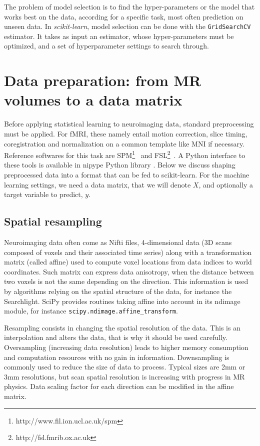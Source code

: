 \documentclass{frontiersSCNS} %
\begin{document}
The problem of model selection is to find the hyper-parameters or the
model that works best on the data, according for a specific task, most
often prediction on unseen data.
%
In {\em scikit-learn}, model selection can be done with the
\texttt{GridSearchCV} estimator. It takes as input an estimator, whose
hyper-parameters must be optimized, and a set of hyperparameter settings
to search through. 

\section{Data preparation: from MR volumes to a data matrix}

Before applying statistical learning to neuroimaging data, standard
preprocessing must be applied. For fMRI, these namely entail motion
correction, slice timing, coregistration and normalization on a common
template like MNI if necessary. Reference softwares for this task are
SPM\footnote{http://www.fil.ion.ucl.ac.uk/spm}~\citep{friston2007} and
FSL\footnote{http://fsl.fmrib.ox.ac.uk}~\citep{smith2004}. A Python
interface to these tools is available in nipype Python library
\citep{gorgolewski2011}. Below we discuss shaping preprocessed data into
a format that can be fed to scikit-learn. For the machine learning
settings, we need a data matrix, that we will denote $X$, and optionally a
target variable to predict, $y$.

\subsection{Spatial resampling}
\label{resampling}

Neuroimaging data often come as Nifti files, 4-dimensional data (3D scans
composed of voxels and their associated time series) along with a
transformation matrix (called affine) used to compute voxel locations
from data indices to world coordinates. Such matrix can express data
anisotropy, when the distance between two voxels is not the same
depending on the direction. This information is used by algorithms
relying on the spatial structure of the data, for instance the
Searchlight. SciPy provides routines taking affine into account in its
ndimage module, for instance \texttt{scipy.ndimage.affine\_transform}.

Resampling consists in changing the spatial resolution of the data. This is
an interpolation and alters the data, that is why it should be used carefully.
Oversampling (increasing data resolution) leads to higher memory consumption
and computation resources with no gain in information.
Downsampling is commonly used to reduce the size of data to process.
Typical sizes are 2mm or 3mm resolutions, but scan spatial resolution is
increasing with progress in MR physics.
Data scaling factor for each direction can be modified in the affine matrix.
\end{document}
